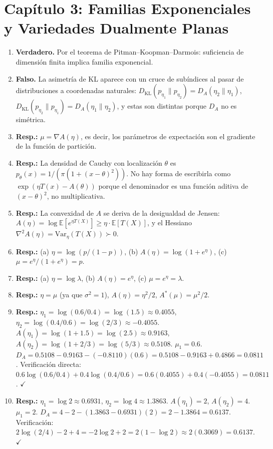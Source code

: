\section*{Capítulo 3: Familias Exponenciales y Variedades Dualmente Planas}

\begin{enumerate}
	\item \textbf{Verdadero.} Por el teorema de Pitman--Koopman--Darmois: suficiencia de dimensión finita implica familia exponencial.
	\item \textbf{Falso.} La asimetría de KL aparece con un cruce de subíndices al pasar de distribuciones a coordenadas naturales: $D_{\mathrm{KL}}(p_{\eta_1} \| p_{\eta_2}) = D_A(\eta_2 \| \eta_1)$, $D_{\mathrm{KL}}(p_{\eta_2} \| p_{\eta_1}) = D_A(\eta_1 \| \eta_2)$, y estas son distintas porque $D_A$ no es simétrica.
	\item \textbf{Resp.:} $\mu = \nabla A(\eta)$, es decir, los parámetros de expectación son el gradiente de la función de partición.
	\item \textbf{Resp.:} La densidad de Cauchy con localización $\theta$ es $p_\theta(x) = 1/(\pi(1+(x-\theta)^2))$.  No hay forma de escribirla como $\exp(\eta T(x) - A(\theta))$ porque el denominador es una función aditiva de $(x-\theta)^2$, no multiplicativa.
	\item \textbf{Resp.:} La convexidad de $A$ se deriva de la desigualdad de Jensen: $A(\eta) = \log\mathbb{E}[e^{\eta T(X)}] \ge \eta \cdot \mathbb{E}[T(X)]$, y el Hessiano $\nabla^2 A(\eta) = \mathrm{Var}_\eta(T(X)) \succ 0$.
	\item \textbf{Resp.:} (a) $\eta = \log(p/(1-p))$, (b) $A(\eta) = \log(1+e^\eta)$, (c) $\mu = e^\eta/(1+e^\eta) = p$.
	\item \textbf{Resp.:} (a) $\eta = \log\lambda$, (b) $A(\eta) = e^\eta$, (c) $\mu = e^\eta = \lambda$.
	\item \textbf{Resp.:} $\eta = \mu$ (ya que $\sigma^2 = 1$), $A(\eta) = \eta^2/2$, $A^*(\mu) = \mu^2/2$.
	\item \textbf{Resp.:} $\eta_1 = \log(0.6/0.4) = \log(1.5) \approx 0.4055$, $\eta_2 = \log(0.4/0.6) = \log(2/3) \approx -0.4055$.  $A(\eta_1) = \log(1+1.5) = \log(2.5) \approx 0.9163$, $A(\eta_2) = \log(1+2/3) = \log(5/3) \approx 0.5108$.  $\mu_1 = 0.6$.  $D_A = 0.5108 - 0.9163 - (-0.8110)(0.6) = 0.5108 - 0.9163 + 0.4866 = 0.0811$.  Verificación directa: $0.6\log(0.6/0.4) + 0.4\log(0.4/0.6) = 0.6(0.4055) + 0.4(-0.4055) = 0.0811$.  $\checkmark$
	\item \textbf{Resp.:} $\eta_1 = \log 2 \approx 0.6931$, $\eta_2 = \log 4 \approx 1.3863$.  $A(\eta_1) = 2$, $A(\eta_2) = 4$.  $\mu_1 = 2$.  $D_A = 4 - 2 - (1.3863 - 0.6931)(2) = 2 - 1.3864 = 0.6137$.  Verificación: $2\log(2/4) - 2 + 4 = -2\log 2 + 2 = 2(1 - \log 2) \approx 2(0.3069) = 0.6137$.  $\checkmark$

\end{enumerate}
